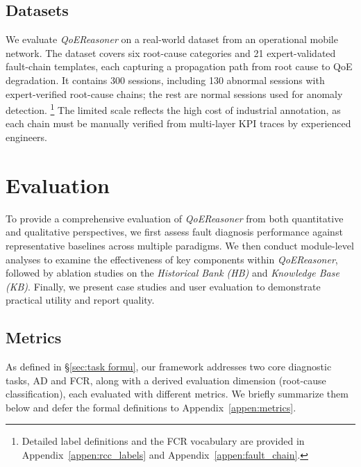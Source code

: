 \documentclass[sigconf,10pt]{acmart} %
\begin{document}
\subsection{Datasets}
We evaluate \textit{QoEReasoner} on a real-world dataset from an operational mobile network. The dataset covers six root-cause categories and 21 expert-validated fault-chain templates, each capturing a propagation path from root cause to QoE degradation. It contains 300 sessions, including 130 abnormal sessions with expert-verified root-cause chains; the rest are normal sessions used for anomaly detection. \footnote{Detailed label definitions and the FCR vocabulary are provided in Appendix~\ref{appen:rcc_labels} and Appendix~\ref{appen:fault_chain}.} The limited scale reflects the high cost of industrial annotation, as each chain must be manually verified from multi-layer KPI traces by experienced engineers.
\section{Evaluation}

To provide a comprehensive evaluation of \textit{QoEReasoner} from both quantitative and qualitative perspectives, we first assess fault diagnosis performance against representative baselines across multiple paradigms. We then conduct module-level analyses to examine the effectiveness of key components within \textit{QoEReasoner}, followed by ablation studies on the \emph{Historical Bank (HB)} and \emph{Knowledge Base (KB)}. Finally, we present case studies and user evaluation to demonstrate practical utility and report quality.

\subsection{Metrics}

As defined in \S\ref{sec:task formu}, our framework addresses two core diagnostic tasks, AD and FCR, along with a derived evaluation dimension (root-cause classification), each evaluated with different metrics. We briefly summarize them below and defer the formal definitions to Appendix~\ref{appen:metrics}.
\end{document}

